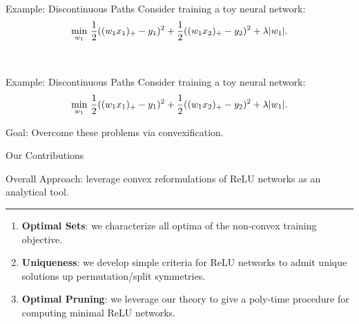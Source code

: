 \documentclass[usenames,dvipsnames,mathserif,notheorems]{beamer}
\newcommand{\horizontalrule}{
	{
			\vspace{-0.5em}
			\center \rule{\textwidth}{0.1em}
			\vspace{-0.2em}
		}
}
\newcommand{\good}[1]{\textcolor{good}{#1}}
\begin{document}
\begin{frame}{Example: Discontinuous Paths}
	Consider training a toy neural network:
	\[
		\min_{w_1} \, \frac 1 2 ((w_1 x_1)_+ - y_1)^2 + \frac 1 2 ((w_1 x_2)_+ - y_2)^2 + \lambda |w_1|.
	\]

	\begin{center}
		
	\end{center}

	\begin{center}
		\Large
		\textcolor{white}{Goal: Overcome these problems via convexification..}
	\end{center}


\end{frame}

\begin{frame}{Example: Discontinuous Paths}
	Consider training a toy neural network:
	\[
		\min_{w_1} \, \frac 1 2 ((w_1 x_1)_+ - y_1)^2 + \frac 1 2 ((w_1 x_2)_+ - y_2)^2 + \lambda |w_1|.
	\]

	\begin{center}
		
	\end{center}

	\pause

	\begin{center}
		\Large
		\good{Goal}: Overcome these problems via convexification.
	\end{center}

\end{frame}

\begin{frame}{Our Contributions}

	{
		\large \good{Overall Approach}: leverage convex reformulations
		of ReLU networks \citep{pilanci2020convex} as an analytical tool.
	}

	\pause
	\vspace{0.5em}
	\horizontalrule
	\vspace{0.5em}

	\begin{enumerate}
		\item \textbf{Optimal Sets}: we characterize all optima of the
		      non-convex training objective.\pause
		      \vspace{0.5em}

		\item \textbf{Uniqueness}: we develop simple criteria for ReLU networks
		      to admit unique solutions up permutation/split symmetries. \pause
		      \vspace{0.5em}

		\item \textbf{Optimal Pruning}: we leverage our theory to give a
		      poly-time procedure for computing minimal ReLU networks.
	\end{enumerate}

\end{frame}
\end{document}

